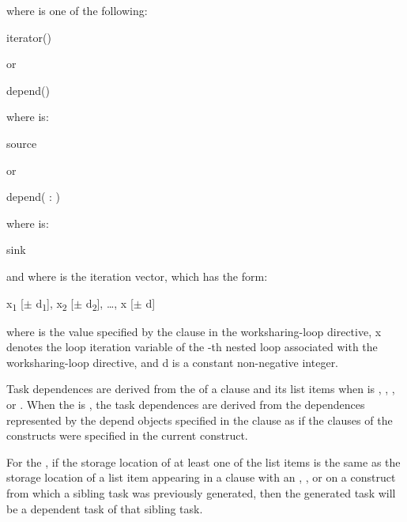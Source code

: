 where  is one of the following:
\begin{indentedcodelist}
iterator() 
\end{indentedcodelist}

or

\begin{ompSyntax}
depend()
\end{ompSyntax}

where  is:
\begin{indentedcodelist}
source
\end{indentedcodelist}

or

\begin{ompSyntax}
depend( : )
\end{ompSyntax}

where  is:
\begin{indentedcodelist}
sink
\end{indentedcodelist}

and where  is the iteration vector, which has the form:

x\textsubscript{1} [$\pm $ d\textsubscript{1}], x\textsubscript{2} [$\pm $ d\textsubscript{2}], \ldots, x\textsubscript{} [$\pm $ d\textsubscript{}]

where  is the value specified by the  clause in the worksharing-loop
directive, x\textsubscript{} denotes the loop iteration variable of the -th
nested loop associated with the worksharing-loop directive, and d\textsubscript{} is a
constant non-negative integer.

\descr
Task dependences are derived from the  of a  clause and its list
items when  is , , , or . 
When the  is , the task dependences are 
derived from the dependences represented by the depend objects specified in the  
clause as if the  clauses of the  constructs were specified in 
the current construct. 

For the  , if the storage location of at least one
of the list items is the same as the storage location of a list item appearing
in a  clause with an , , or   on a construct
from which a sibling task was previously generated, then the generated task
will be a dependent task of that sibling task.

